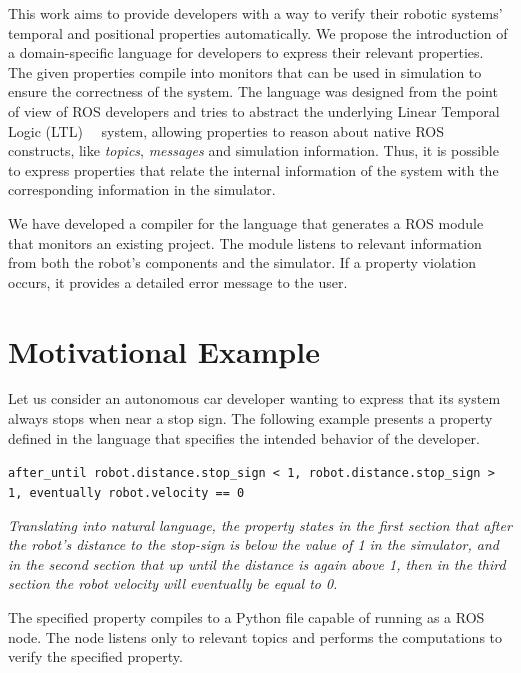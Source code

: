 \documentclass[runningheads]{llncs}
\begin{document}
This work aims to provide developers with a way to verify their robotic systems' temporal and positional properties automatically. We propose the introduction of a domain-specific language for developers to express their relevant properties. The given properties compile into monitors that can be used in simulation to ensure the correctness of the system. The language was designed from the point of view of ROS developers and tries to abstract the underlying Linear Temporal Logic (LTL)~\cite{pnueli1977temporal}~\cite{dwyer1998property} system, allowing properties to reason about native ROS constructs, like \textit{topics}, \textit{messages} and simulation information. Thus, it is possible to express properties that relate the internal information of the system with the corresponding information in the simulator.

We have developed a compiler for the language that generates a ROS module that monitors an existing project. The module listens to relevant information from both the robot's components and the simulator. If a property violation occurs, it provides a detailed error message to the user.


\section{Motivational Example}

Let us consider an autonomous car developer wanting to express that its system always stops when near a stop sign. The following example presents a property defined in the language that specifies the intended behavior of the developer.


\vspace{2mm}
\texttt{after\_until robot.distance.stop\_sign < 1, robot.distance.stop\_sign > 1, eventually robot.velocity == 0}
\vspace{2mm}

\textit{Translating into natural language, the property states in the first section that after the robot's distance to the stop-sign is below the value of 1 in the simulator, and in the second section that up until the distance is again above 1, then in the third section the robot velocity will eventually be equal to 0.}
\vspace{2mm}

The specified property compiles to a Python file capable of running as a ROS node. The node listens only to relevant topics and performs the computations to verify the specified property.
\end{document}
